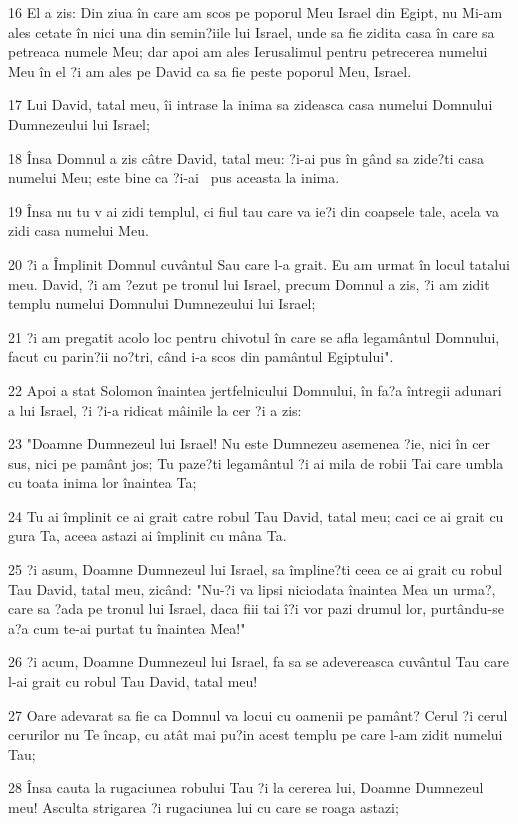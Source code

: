 \par 16 El a zis: Din ziua în care am scos pe poporul Meu Israel din Egipt, nu Mi-am ales cetate în nici una din semin?iile lui Israel, unde sa fie zidita casa în care sa petreaca numele Meu; dar apoi am ales Ierusalimul pentru petrecerea numelui Meu în el ?i am ales pe David ca sa fie peste poporul Meu, Israel.
\par 17 Lui David, tatal meu, îi intrase la inima sa zideasca casa numelui Domnului Dumnezeului lui Israel;
\par 18 Însa Domnul a zis câtre David, tatal meu: ?i-ai pus în gând sa zide?ti casa numelui Meu; este bine ca ?i-ai  pus aceasta la inima.
\par 19 Însa nu tu v ai zidi templul, ci fiul tau care va ie?i din coapsele tale, acela va zidi casa numelui Meu.
\par 20 ?i a Împlinit Domnul cuvântul Sau care l-a grait. Eu am urmat în locul tatalui meu. David, ?i am ?ezut pe tronul lui Israel, precum Domnul a zis, ?i am zidit templu numelui Domnului Dumnezeului lui Israel;
\par 21 ?i am pregatit acolo loc pentru chivotul în care se afla legamântul Domnului, facut cu parin?ii no?tri, când i-a scos din pamântul Egiptului".
\par 22 Apoi a stat Solomon înaintea jertfelnicului Domnului, în fa?a întregii adunari a lui Israel, ?i ?i-a ridicat mâinile la cer ?i a zis:
\par 23 "Doamne Dumnezeul lui Israel! Nu este Dumnezeu asemenea ?ie, nici în cer sus, nici pe pamânt jos; Tu paze?ti legamântul ?i ai mila de robii Tai care umbla cu toata inima lor înaintea Ta;
\par 24 Tu ai împlinit ce ai grait catre robul Tau David, tatal meu; caci ce ai grait cu gura Ta, aceea astazi ai împlinit cu mâna Ta.
\par 25 ?i asum, Doamne Dumnezeul lui Israel, sa împline?ti ceea ce ai grait cu robul Tau David, tatal meu, zicând: "Nu-?i va lipsi niciodata înaintea Mea un urma?, care sa ?ada pe tronul lui Israel, daca fiii tai î?i vor pazi drumul lor, purtându-se a?a cum te-ai purtat tu înaintea Mea!"
\par 26 ?i acum, Doamne Dumnezeul lui Israel, fa sa se adevereasca cuvântul Tau care l-ai grait cu robul Tau David, tatal meu!
\par 27 Oare adevarat sa fie ca Domnul va locui cu oamenii pe pamânt? Cerul ?i cerul cerurilor nu Te încap, cu atât mai pu?in acest templu pe care l-am zidit numelui Tau;
\par 28 Însa cauta la rugaciunea robului Tau ?i la cererea lui, Doamne Dumnezeul meu! Asculta strigarea ?i rugaciunea lui cu care se roaga astazi;
